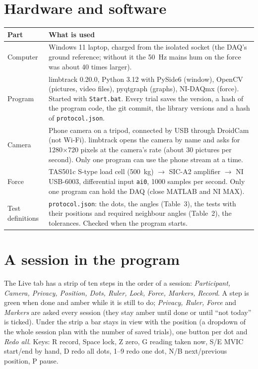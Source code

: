 \documentclass[a4paper,10pt]{article}
\newcommand{\lt}{\textsf{limbtrack}}
\newcommand{\ltversion}{0.20.0}
\newcommand{\code}[1]{\texttt{#1}}
\begin{document}
\section{Hardware and software}
\begin{tabularx}{\linewidth}{@{}lL@{}}
\toprule
Part & What is used \\
\midrule
Computer & Windows 11 laptop, charged from the isolated socket (the DAQ's ground reference; without it the 50~Hz mains hum on the force was
  about 40 times larger). \\
Program & \lt{} \ltversion, Python 3.12 with PySide6 (window), OpenCV (pictures, video files), pyqtgraph (graphs), NI-DAQmx (force).
  Started with \code{Start.bat}. Every trial saves the version, a hash of the program code, the git commit, the library versions and a
  hash of \code{protocol.json}. \\
Camera & Phone camera on a tripod, connected by USB through DroidCam (not Wi-Fi). \lt{} opens the camera by name and asks for
  1280$\times$720 pixels at the camera's rate (about 30 pictures per second). Only one program can use the phone stream at a time. \\
Force & TAS501c S-type load cell (500~kg) $\rightarrow$ SIC-A2 amplifier $\rightarrow$ NI USB-6003, differential input \code{ai0},
  1000 samples per second. Only one program can hold the DAQ (close MATLAB and NI MAX). \\
Test definitions & \code{protocol.json}: the dots, the angles (Table~3), the tests with their positions and required neighbour angles
  (Table~2), the tolerances. Checked when the program starts. \\
\bottomrule
\end{tabularx}

\section{A session in the program}
The Live tab has a strip of ten steps in the order of a session: \emph{Participant, Camera, Privacy, Position, Dots, Ruler, Lock, Force,
Markers, Record}. A step is green when done and amber while it is still to do; \emph{Privacy, Ruler, Force} and \emph{Markers} are asked
every session (they stay amber until done or until ``not today'' is ticked). Under the strip a bar stays in view with the position (a
dropdown of the whole session plan with the number of saved trials), one button per dot and \emph{Redo all}. Keys: R record, Space lock,
Z zero, G reading taken now, S/E MVIC start/end by hand, D redo all dots, 1--9 redo one dot, N/B next/previous position, P pause.
\end{document}
